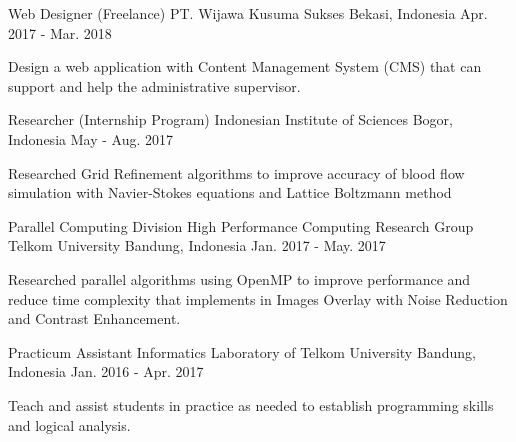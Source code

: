 \begin{cventries}

  \cventry
    {Web Designer (Freelance)} %
    {PT. Wijawa Kusuma Sukses} %
    {Bekasi, Indonesia} %
    {Apr. 2017 - Mar. 2018} %
    {
      \begin{cvitems} %
        \item {Design a web application with Content Management System (CMS) that can support and help the administrative supervisor.}
      \end{cvitems}
    }

  \cventry
    {Researcher (Internship Program)} %
    {Indonesian Institute of Sciences} %
    {Bogor, Indonesia} %
    {May - Aug. 2017} %
    {
      \begin{cvitems} %
        \item {Researched Grid Refinement algorithms to improve accuracy of blood flow simulation with Navier-Stokes equations and Lattice Boltzmann method}
      \end{cvitems}
    }

  \cventry
    {Parallel Computing Division} %
    {High Performance Computing Research Group Telkom University} %
    {Bandung, Indonesia} %
    {Jan. 2017 - May. 2017} %
    {
      \begin{cvitems} %
        \item {Researched parallel algorithms using OpenMP to improve performance and reduce time complexity that implements in Images Overlay with Noise Reduction and Contrast Enhancement.}
      \end{cvitems}
    }
    
  \cventry
    {Practicum Assistant} %
    {Informatics Laboratory of Telkom University} %
    {Bandung, Indonesia} %
    {Jan. 2016 - Apr. 2017} %
    {
      \begin{cvitems} %
        \item {Teach and assist students in practice as needed to establish programming skills and logical analysis.}
      \end{cvitems}
    }


\end{cventries}
